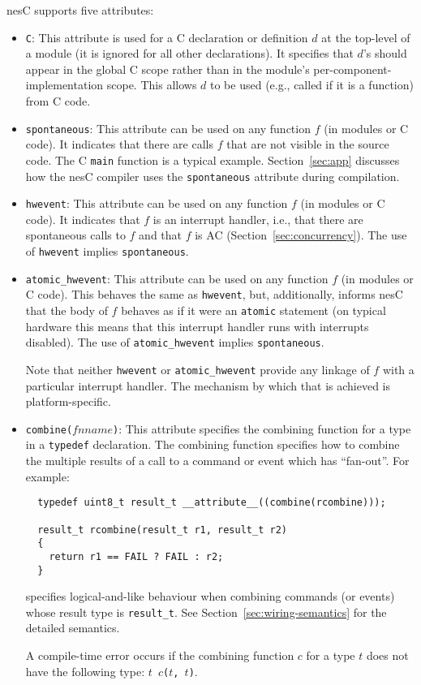 \documentclass[11pt,letterpaper]{article}
\newcommand{\kw}[1]{{\tt #1}}
\newcommand{\code}[1]{{\tt #1}}
\newcommand{\nesc}{nesC\xspace}
\begin{document}
\nesc supports five attributes:
\begin{itemize}
\item \code{C}: This attribute is used for a C declaration or definition
$d$ at the top-level of a module (it is ignored for all other
declarations). It specifies that $d$'s should appear in the global C scope
rather than in the module's per-component-implementation scope. This allows
$d$ to be used (e.g., called if it is a function) from C code.

\item \code{spontaneous}: This attribute can be used on any function $f$
(in modules or C code). It indicates that there are calls $f$ that are not
visible in the source code. The C \code{main} function is a typical
example. Section~\ref{sec:app} discusses how the \nesc compiler uses the
\code{spontaneous} attribute during compilation.

\item \code{hwevent}: This attribute can be used on any function $f$ (in
modules or C code). It indicates that $f$ is an interrupt handler, i.e.,
that there are spontaneous calls to $f$ and that $f$ is AC
(Section~\ref{sec:concurrency}). The use of \code{hwevent} implies
\code{spontaneous}.

\item \code{atomic\_hwevent}: This attribute can be used on any function
$f$ (in modules or C code). This behaves the same as \code{hwevent}, but,
additionally, informs \nesc that the body of $f$ behaves as if it were an
\kw{atomic} statement (on typical hardware this means that this interrupt
handler runs with interrupts disabled). The use of \code{atomic\_hwevent}
implies \code{spontaneous}.

Note that neither \code{hwevent} or \code{atomic\_hwevent} provide any
linkage of $f$ with a particular interrupt handler. The mechanism by
which that is achieved is platform-specific.

\item \code{combine($fnname$)}: This attribute specifies the combining
function for a type in a \kw{typedef} declaration. The combining function
specifies how to combine the multiple results of a call to a command
or event which has ``fan-out''. For example:
\begin{verbatim}
  typedef uint8_t result_t __attribute__((combine(rcombine)));

  result_t rcombine(result_t r1, result_t r2)
  {
    return r1 == FAIL ? FAIL : r2;
  }
\end{verbatim}
specifies logical-and-like behaviour when combining commands (or events)
whose result type is \code{result\_t}. See
Section~\ref{sec:wiring-semantics} for the detailed semantics.

A compile-time error occurs if the combining function $c$ for a type $t$
does not have the following type: \code{$t$ $c$($t$, $t$)}.

\end{itemize}
\end{document}
